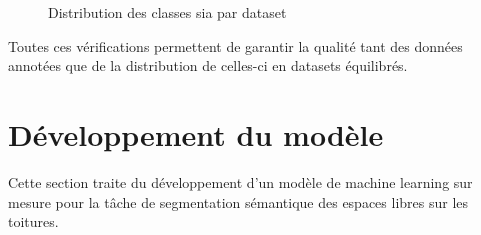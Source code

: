 \begin{figure}[H]
    \centering
    \caption{Distribution des classes \gls{sia} par dataset}
    \label{fig:ch3_postprocessing_dataset_20_distribution_barchart_classe}
\end{figure}

Toutes ces vérifications permettent de garantir la qualité tant des données annotées que de la distribution de celles-ci en datasets équilibrés.

\section{Développement du modèle}
Cette section traite du développement d'un modèle de machine learning sur mesure pour la tâche de segmentation sémantique des espaces libres sur les toitures.

